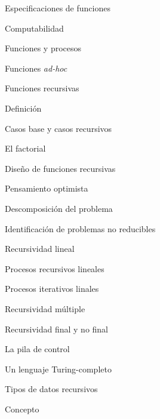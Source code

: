 \begin{longenum}
\begin{longenum}
\begin{longenum}
            \begin{longenum}
                \item Especificaciones de funciones
            \end{longenum}
        \end{longenum}
        \item Computabilidad 
        \begin{longenum}
            \item Funciones y procesos
            \item Funciones \textit{ad-hoc}
            \item Funciones recursivas
            \begin{longenum}
                \item Definición
                \item Casos base y casos recursivos
                \item El factorial
                \item Diseño de funciones recursivas
                \begin{longenum}
                    \item Pensamiento optimista
                    \item Descomposición del problema
                    \item Identificación de problemas no reducibles
                \end{longenum}
                \item Recursividad lineal
                \begin{longenum}
                    \item Procesos recursivos lineales
                    \item Procesos iterativos linales
                \end{longenum}
                \item Recursividad múltiple
                \item Recursividad final y no final
            \end{longenum}
            \item La pila de control
            \item Un lenguaje Turing-completo
        \end{longenum}
        \item Tipos de datos recursivos
        \begin{longenum}
            \item Concepto

\end{longenum}
\end{longenum}
\end{longenum}
